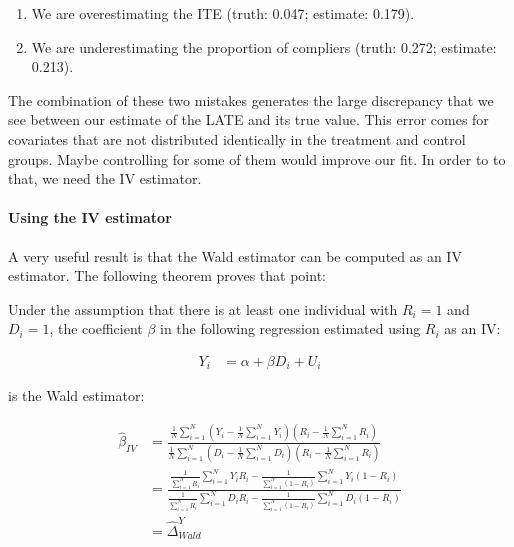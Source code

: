 \documentclass[]{book}
\providecommand{\tightlist}{%
  \setlength{\itemsep}{0pt}\setlength{\parskip}{0pt}}
\let\oldparagraph\paragraph
\renewcommand{\paragraph}[1]{\oldparagraph{#1}\mbox{}}
\theoremstyle{definition}
\theoremstyle{definition}
\theoremstyle{definition}
\theoremstyle{remark}
\let\BeginKnitrBlock\begin \let\EndKnitrBlock\end
\begin{document}
\begin{enumerate}
\def\labelenumi{\arabic{enumi}.}
\tightlist
\item
  We are overestimating the ITE (truth: 0.047; estimate: 0.179).
\item
  We are underestimating the proportion of compliers (truth: 0.272;
  estimate: 0.213).
\end{enumerate}

The combination of these two mistakes generates the large discrepancy
that we see between our estimate of the LATE and its true value. This
error comes for covariates that are not distributed identically in the
treatment and control groups. Maybe controlling for some of them would
improve our fit. In order to to that, we need the IV estimator.

\paragraph{Using the IV estimator}\label{using-the-iv-estimator}

A very useful result is that the Wald estimator can be computed as an IV
estimator. The following theorem proves that point:

\BeginKnitrBlock{theorem}[Wald is IV]
\protect\hypertarget{thm:WaldIV}{}{\label{thm:WaldIV} \iffalse (Wald is IV)
\fi{} }Under the assumption that there is at least one individual with
\(R_i=1\) and \(D_i=1\), the coefficient \(\beta\) in the following
regression estimated using \(R_i\) as an IV:

\begin{align*}
        Y_i &  = \alpha + \beta D_i + U_i
    \end{align*}

is the Wald estimator:

\begin{align*}
\hat{\beta}_{IV} & = \frac{\frac{1}{N}\sum_{i=1}^N\left(Y_i-\frac{1}{N}\sum_{i=1}^NY_i\right)\left(R_i-\frac{1}{N}\sum_{i=1}^NR_i\right)}{\frac{1}{N}\sum_{i=1}^N\left(D_i-\frac{1}{N}\sum_{i=1}^ND_i\right)\left(R_i-\frac{1}{N}\sum_{i=1}^NR_i\right)} \\
                                & = \frac{\frac{1}{\sum_{i=1}^N R_i}\sum_{i=1}^N Y_iR_i-\frac{1}{\sum_{i=1}^N (1-R_i)}\sum_{i=1}^N Y_i(1-R_i)}{\frac{1}{\sum_{i=1}^N R_i}\sum_{i=1}^N D_iR_i-\frac{1}{\sum_{i=1}^N (1-R_i)}\sum_{i=1}^N D_i(1-R_i)}\\
                  & = \hat{\Delta}^Y_{Wald} 
\end{align*}
\EndKnitrBlock{theorem}
\end{document}
